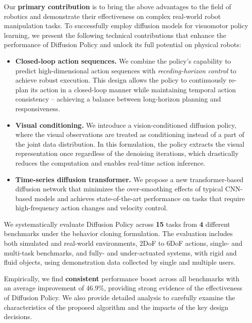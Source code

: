 \documentclass[Afour,sageh,times]{sagej}
\begin{document}
Our \textbf{primary contribution} is to bring the above advantages to the field of robotics and demonstrate their effectiveness on complex real-world robot manipulation tasks. To successfully employ diffusion models for visuomotor policy learning, we present the following technical contributions that enhance the performance of Diffusion Policy and unlock its full potential on physical robots:
\begin{itemize} %
    \item \textbf{Closed-loop action sequences.} We combine the policy's capability to predict high-dimensional action sequences with \textit{receding-horizon control} to achieve robust execution. This design allows the policy to continuously re-plan its action in a closed-loop manner while maintaining temporal action consistency -- achieving a balance between long-horizon planning and responsiveness.


    \item \textbf{Visual conditioning.} We introduce a vision-conditioned diffusion policy, where the visual observations are treated as conditioning instead of a part of the joint data distribution.  In this formulation, the policy extracts the visual representation once regardless of the denoising iterations, which drastically reduces the computation and enables real-time action inference.


    \item \textbf{Time-series diffusion transformer.} We propose a new transformer-based diffusion network  that minimizes the over-smoothing effects of typical CNN-based models and achieves state-of-the-art performance on tasks that require high-frequency action changes and velocity control.
\end{itemize}

We systematically evaluate Diffusion Policy across \textbf{15} tasks from \textbf{4} different benchmarks \cite{ibc, gupta2019relay, robomimic, bet} under the behavior cloning formulation. The evaluation includes both simulated and real-world environments, 2DoF to 6DoF actions, single- and multi-task benchmarks, and fully- and under-actuated systems, with rigid and fluid objects, using demonstration data collected by single and multiple users.

Empirically, we find \textbf{consistent} performance boost across all benchmarks with an average improvement of 46.9\%, providing strong evidence of the effectiveness of Diffusion Policy. We also provide detailed analysis to carefully examine the characteristics of the proposed algorithm and the impacts of the key design decisions.
\end{document}
